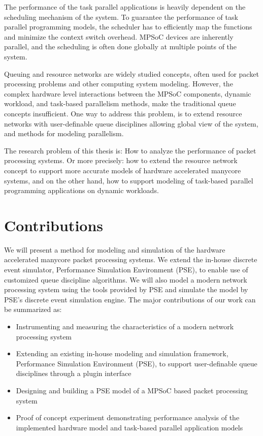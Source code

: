 The performance of the task parallel applications is heavily dependent on the scheduling mechanism of the system. To guarantee the performance of task parallel programming models, the scheduler has to efficiently map the functions and minimize the context switch overhead. MPSoC devices are inherently parallel, and the scheduling is often done globally at multiple points of the system.

Queuing and resource networks are widely studied concepts, often used for packet processing problems and other computing system modeling. However, the complex hardware level interactions between the MPSoC components, dynamic workload, and task-based parallelism methods, make the traditional queue concepts insufficient. One way to address this problem, is to extend resource networks with user-definable queue disciplines allowing global view of the system, and methods for modeling parallelism.

The research problem of this thesis is: How to analyze the performance of packet processing systems. Or more precisely: how to extend the resource network concept to support more accurate models of hardware accelerated manycore systems, and on the other hand, how to support modeling of task-based parallel programming applications on dynamic workloads.

\section{Contributions}
We will present a method for modeling and simulation of the hardware accelerated manycore packet processing systems. We extend the in-house discrete event simulator, Performance Simulation Environment (PSE), to enable use of customized queue discipline algorithms. We will also model a modern network processing system using the tools provided by PSE and simulate the model by PSE's discrete event simulation engine. The major contributions of our work can be summarized as:

\begin{itemize}

\item Instrumenting and measuring the characteristics of a modern network processing system

\item Extending an existing in-house modeling and simulation framework, Performance Simulation Environment (PSE), to support user-definable queue disciplines through a plugin interface

\item Designing and building a PSE model of a MPSoC based packet processing system

\item Proof of concept experiment demonstrating performance analysis of the implemented hardware model and task-based parallel application models

\end{itemize}

